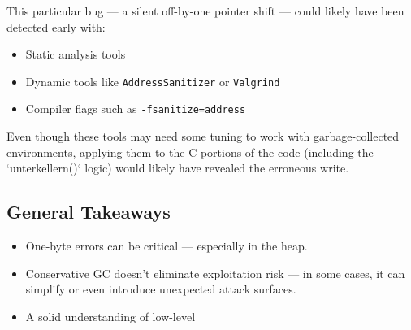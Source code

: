 \documentclass[a4paper,11pt]{article}
\begin{document}
This particular bug — a silent off-by-one pointer shift — could likely have been detected early with:
\begin{itemize}
    \item Static analysis tools
    \item Dynamic tools like \texttt{AddressSanitizer} or \texttt{Valgrind}
    \item Compiler flags such as \texttt{-fsanitize=address}
\end{itemize}

Even though these tools may need some tuning to work with garbage-collected environments, applying them to the C portions of the code (including the `unterkellern()` logic) would likely have revealed the erroneous write.

\subsection*{General Takeaways}
\begin{itemize}
    \item One-byte errors can be critical — especially in the heap.
    \item Conservative GC doesn't eliminate exploitation risk — in some cases, it can simplify or even introduce unexpected attack surfaces.
    \item A solid understanding of low-level

        
\end{itemize}
\end{document}
